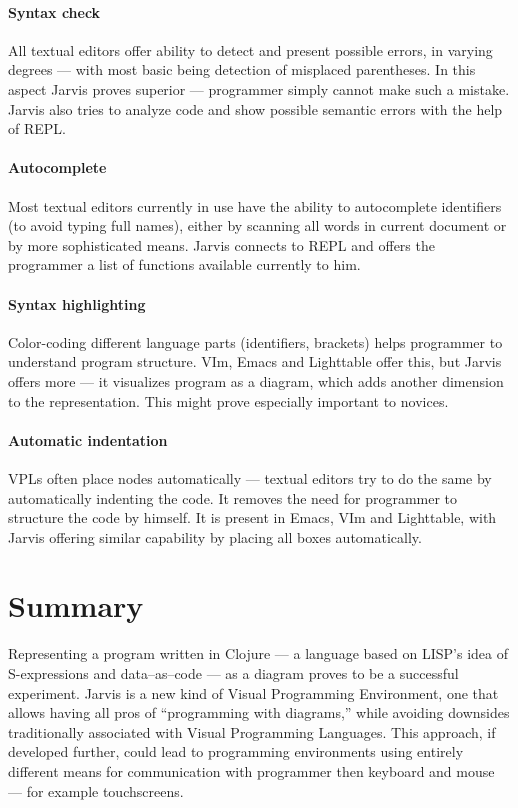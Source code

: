 \documentclass[english,mgr,shortabstract]{iithesis}
\begin{document}
\subsubsection*{Syntax check}
All textual editors offer ability to detect and present possible errors, in
varying degrees --- with most basic being detection of misplaced parentheses.
In this aspect Jarvis proves superior --- programmer simply cannot make such
a mistake. Jarvis also tries to analyze code and show possible semantic errors
with the help of REPL.\@
    
\subsubsection*{Autocomplete}
Most textual editors currently in use have the ability to autocomplete identifiers
(to avoid typing full names), either by scanning all words in current document
or by more sophisticated means. Jarvis connects to REPL and offers the
programmer a list of functions available currently to him.
    
\subsubsection*{Syntax highlighting}
Color-coding different language parts (identifiers, brackets) helps programmer
to understand program structure. VIm, Emacs and Lighttable offer this, but
Jarvis offers more --- it visualizes program as a diagram, which adds another
dimension to the representation. This might prove especially important to novices.
    
\subsubsection*{Automatic indentation}
VPLs often place nodes automatically --- textual editors try to do the same by
automatically indenting the code. It removes the need for programmer to
structure the code by himself. It is present in Emacs, VIm and Lighttable, with
Jarvis offering similar capability by placing all boxes automatically.

\chapter{Summary}
Representing a program written in Clojure --- a language based on LISP's idea of
S-expressions and
data--as--code --- as a diagram proves to be a successful experiment.
Jarvis is a new kind of Visual Programming Environment, one that allows
having all pros of ``programming with diagrams,'' while avoiding downsides
traditionally associated with Visual Programming Languages. This approach, if
developed further, could lead to programming environments using entirely different means
for communication with programmer then keyboard and mouse --- for example
touchscreens.
\end{document}
